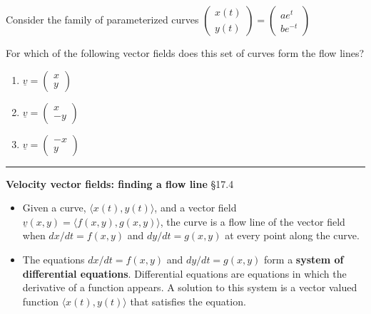 \documentclass[12pt,letterpaper,noanswers]{exam}
\newcommand{\mb}[1]{\underline{#1}}
\begin{document}
Consider the family of parameterized curves $\left(\begin{array}{r}x(t) \\ y(t)\end{array}\right)=\left(\begin{array}{r} ae^t \\ be^{-t}\end{array}\right)$

For which of the following vector fields does this set of curves form the flow lines?

\begin{enumerate}
\itemsep2em
    \item $\mb v = \left(\begin{array}{r} x \\ y\end{array}\right)$
     \item $\mb v = \left(\begin{array}{r} x \\ -y\end{array}\right)$
     \item $\mb v = \left(\begin{array}{r} -x \\ y\end{array}\right)$
\end{enumerate}
\vspace{0.5in}

\vspace{0.2cm}
\hrule
\vspace{0.2cm}

\noindent\textbf{Velocity vector fields: finding a flow line} \S 17.4
\begin{tcolorbox}
\begin{itemize}
\itemsep0em
    \item Given a curve, $\langle x(t), y(t)\rangle$, and a vector field $\mb v(x,y) = \langle f(x,y), g(x,y)\rangle$, the curve is a flow line of the vector field when $dx/dt = f(x,y)$ and $dy/dt = g(x,y)$ at every point along the curve.
    \item The equations $dx/dt = f(x,y)$ and $dy/dt = g(x,y)$ form a \textbf{system of differential equations}.  Differential equations are equations in which the derivative of a function appears.  A solution to this system is a vector valued function $\langle x(t), y(t)\rangle$ that satisfies the equation.
\end{itemize}
 
\end{tcolorbox}
\end{document}
